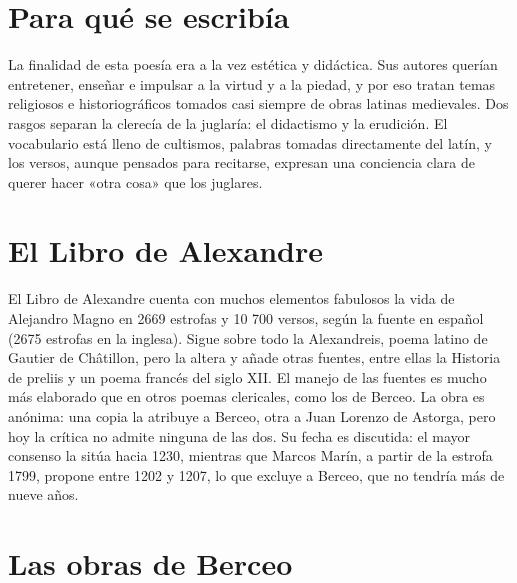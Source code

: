 \documentclass{book}
\begin{document}

\section{Para qué se escribía}

La finalidad de esta poesía era a la vez estética y didáctica. Sus autores querían entretener, enseñar e impulsar a la virtud y a la piedad, y por eso tratan temas religiosos e historiográficos tomados casi siempre de obras latinas medievales. Dos rasgos separan la clerecía de la juglaría: el didactismo y la erudición. El vocabulario está lleno de cultismos, palabras tomadas directamente del latín, y los versos, aunque pensados para recitarse, expresan una conciencia clara de querer hacer «otra cosa» que los juglares.


\section{El Libro de Alexandre}

El Libro de Alexandre cuenta con muchos elementos fabulosos la vida de Alejandro Magno en 2669 estrofas y 10 700 versos, según la fuente en español (2675 estrofas en la inglesa). Sigue sobre todo la Alexandreis, poema latino de Gautier de Châtillon, pero la altera y añade otras fuentes, entre ellas la Historia de preliis y un poema francés del siglo XII. El manejo de las fuentes es mucho más elaborado que en otros poemas clericales, como los de Berceo. La obra es anónima: una copia la atribuye a Berceo, otra a Juan Lorenzo de Astorga, pero hoy la crítica no admite ninguna de las dos. Su fecha es discutida: el mayor consenso la sitúa hacia 1230, mientras que Marcos Marín, a partir de la estrofa 1799, propone entre 1202 y 1207, lo que excluye a Berceo, que no tendría más de nueve años.


\section{Las obras de Berceo}
\end{document}
